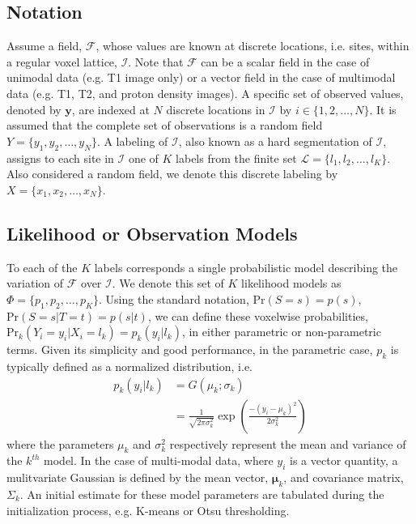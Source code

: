 \documentclass[11pt,english]{article}
\begin{document}
\subsection{Notation}

Assume a field, $\mathcal{F}$, whose values are known at discrete locations, i.e. sites, within a regular voxel lattice, $\mathcal{I}$.  Note that $\mathcal{F}$ can be a scalar field in the case of unimodal data (e.g. T1 image only) or a vector field in the case of multimodal data (e.g. T1, T2, and proton density images).
A specific set of observed values, denoted by $\mathbf{y}$, are indexed at $N$ discrete locations in $\mathcal{I}$ by $i \in \{1, 2, \ldots, N\}$.  It is assumed that the complete set of observations is a random field $Y = \{y_1, y_2, \ldots, y_N \}$.    A labeling of $\mathcal{I}$, 
also known as a hard segmentation of $\mathcal{I}$,
assigns to each site in $\mathcal{I}$ one of $K$ labels from the finite set $\mathcal{L} = \{l_1, l_2, \ldots, l_K\}$.  Also considered a random field, we denote this discrete labeling by $X = \{x_1, x_2, \ldots, x_N\}$.


\subsection{Likelihood or Observation Models}

To each of the $K$ labels corresponds a single probabilistic model describing the variation of $\mathcal{F}$ over $\mathcal{I}$.  We denote this set of $K$ likelihood models as $\Phi = \{p_1, p_2, \ldots, p_K\}$.  Using the standard notation, $\mathrm{Pr}(S=s) = p(s)$, $\mathrm{Pr}(S=s|T=t) = p(s|t)$, we can define these voxelwise probabilities, $\mathrm{Pr}_k( Y_i = y_i | X_i = l_k ) = p_k(y_i|l_k)$, in either parametric or non-parametric terms.   Given its simplicity and good performance, in the parametric case, $p_k$ is typically defined as a normalized distribution, i.e.
\begin{align}\label{eq:param}
  p_k\left(y_i|l_k\right) &= G\left(\mu_k;\sigma_k\right) \nonumber \\
                    &= \frac{1}{\sqrt{2\pi \sigma_k^2}}\exp\left( \frac{ -(y_i - \mu_k)^2 }{2\sigma_k^2} \right)
\end{align}
where the parameters $\mu_k$ and $\sigma_k^2$ respectively represent
the mean and variance of the $k^{th}$ model.  In the case of
multi-modal data, where $y_i$ is a vector quantity, a mulitvariate
Gaussian is defined by the mean vector, $\boldsymbol{\mu}_k$, and
covariance matrix, $\Sigma_k$.  An initial estimate for these model
parameters are tabulated during the initialization process,
e.g. K-means or Otsu thresholding.
\end{document}
